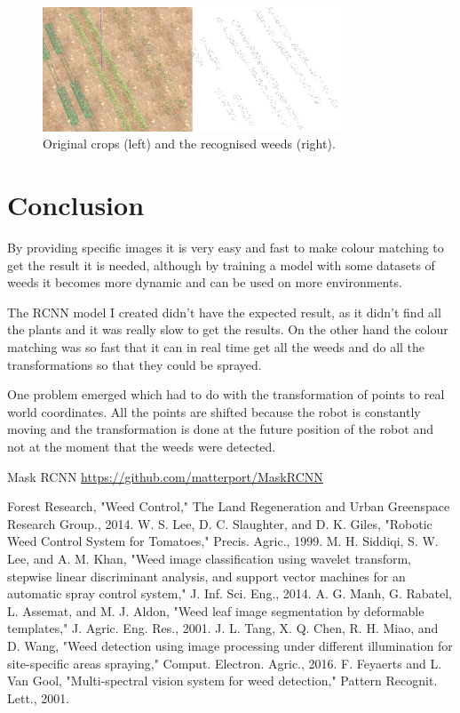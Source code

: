 \documentclass[journal]{IEEEtran}
\begin{document}
\begin{figure}[ht]
\includegraphics[width=3.5in]{allweeds}
\caption{Original crops (left) and the recognised weeds (right).}
\label{all_weeds}
\end{figure}



\section{Conclusion}
By providing specific images it is very easy and fast to make colour matching to get the result it is needed, although by training a model with some datasets of weeds it becomes more dynamic and can be used on more environments.

The RCNN model I created didn't have the expected result, as it didn't find all the plants and it was really slow to get the results. On the other hand the colour matching was so fast that it can in real time get all the weeds and do all the transformations so that they could be sprayed.

One problem emerged which had to do with the transformation of points to real world coordinates. All the points are shifted because the robot is constantly moving and the transformation is done at the future position of the robot and not at the moment that the weeds were detected.




\begin{thebibliography}{}
Mask RCNN \url{https://github.com/matterport/MaskRCNN}

Forest Research, "Weed Control," The Land Regeneration and Urban Greenspace Research Group., 2014.
W. S. Lee, D. C. Slaughter, and D. K. Giles, "Robotic Weed Control System for Tomatoes," Precis. Agric., 1999.
M. H. Siddiqi, S. W. Lee, and A. M. Khan, "Weed image classification using wavelet transform, stepwise linear discriminant analysis, and support vector machines for an automatic spray control system," J. Inf. Sci. Eng., 2014.
A. G. Manh, G. Rabatel, L. Assemat, and M. J. Aldon, "Weed leaf image segmentation by deformable templates," J. Agric. Eng. Res., 2001.
J. L. Tang, X. Q. Chen, R. H. Miao, and D. Wang, "Weed detection using image processing under different illumination for site-specific areas spraying," Comput. Electron. Agric., 2016.
F. Feyaerts and L. Van Gool, "Multi-spectral vision system for weed detection," Pattern Recognit. Lett., 2001.
\end{thebibliography}
\end{document}
